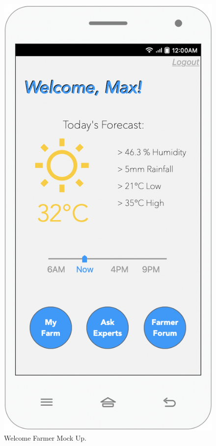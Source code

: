 \begin{multicols}{3}
\begin{figure}[H]
\centering
\includegraphics[scale=0.35]{../images_diagrams/mock_ups/welcomefarmer100.png}
\caption{\label{fig:mock_farmer}Welcome Farmer Mock Up.}
\end{figure}



\end{multicols}
